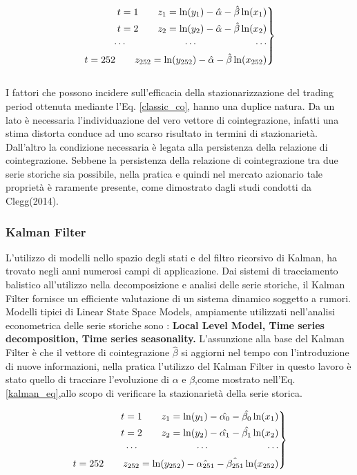 \documentclass[]{article}
\newenvironment{rcases}
{\left.\begin{aligned}}
	{\end{aligned}\right\rbrace}
\begin{document}
\begin{equation}\label{classic_co}
	\begin{rcases}
		t=1 \qquad z_{1} = \ln(y_1) - \hat{\alpha} - \hat{\beta}\ln(x_1) \\
		t=2 \qquad z_{2} = \ln(y_2) - \hat{\alpha} - \hat{\beta}\ln(x_2) \\
		\cdots    \qquad \qquad \qquad \cdots  \qquad \qquad \qquad \cdots \\
	t=252 \qquad z_{252} = \ln(y_{252}) - \hat{\alpha} - \hat{\beta}\ln(x_{252}) \\
	\end{rcases}
\end{equation}
\\
I fattori che possono incidere sull’efficacia della stazionarizzazione del trading period ottenuta mediante l’Eq. \ref{classic_co}, hanno una duplice natura. Da un lato è necessaria l’individuazione del vero vettore di cointegrazione, infatti una stima distorta conduce ad uno scarso risultato in termini di stazionarietà. Dall’altro la condizione necessaria è legata alla persistenza della relazione di cointegrazione. Sebbene la persistenza della relazione di cointegrazione tra due serie storiche sia possibile, nella pratica e quindi nel mercato azionario tale proprietà è raramente presente, come dimostrato dagli studi condotti da Clegg(2014).

\subsubsection*{Kalman Filter}
L'utilizzo di modelli nello spazio degli stati e del filtro ricorsivo di Kalman, ha trovato negli anni numerosi campi di applicazione. Dai sistemi di tracciamento balistico all'utilizzo nella decomposizione e analisi delle serie storiche, il Kalman Filter fornisce un efficiente valutazione di un sistema dinamico soggetto a rumori.
Modelli tipici di Linear State Space Models, ampiamente utilizzati nell'analisi econometrica delle serie storiche sono : \textbf{Local Level Model, Time series decomposition, Time series seasonality.}
L'assunzione alla base del Kalman Filter è che il vettore di cointegrazione $\hat{\beta}$ si aggiorni nel tempo con l'introduzione di nuove informazioni, nella pratica l'utilizzo del Kalman Filter in questo lavoro è stato quello di tracciare l'evoluzione di $\alpha$ e $\beta$,come mostrato nell'Eq. \ref{kalman_eq},allo scopo di verificare la stazionarietà della serie storica.


\begin{equation}\label{kalman_eq}
	\begin{rcases}
		t=1 \qquad z_{1} = \ln(y_1) - \hat{\alpha_0} - \hat{\beta_0}\ln(x_1) \\
		t=2 \qquad z_{2} = \ln(y_2) - \hat{\alpha_1} - \hat{\beta_1}\ln(x_2) \\
		\cdots    \qquad \qquad \qquad \cdots  \qquad \qquad \qquad \cdots \\
		t=252 \qquad z_{252} = \ln(y_{252}) - \hat{\alpha_{251}} - \hat{\beta_{251}}\ln(x_{252}) \\
	\end{rcases}
\end{equation}
\\
\end{document}
